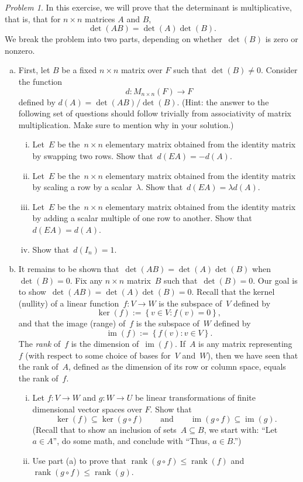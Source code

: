 \documentclass[11pt,twoside]{amsart}
\theoremstyle{plain}
\theoremstyle{remark}
\newtheorem{prob}{Problem}
\theoremstyle{definition}
\theoremstyle{definition}
\newcommand{\im}{\operatorname{im}}
\newcommand{\rank}{\operatorname{rank}}
\begin{document}
\begin{prob}
   In this exercise, we will prove that the determinant is multiplicative, that is, that for $n\times n$ matrices $A$ and $B$, 
  \[
      \det(AB)=\det(A)\det(B).
  \]    
  We break the problem into two parts, depending on whether~$\det(B)$ is zero or
  nonzero.  
  
  \begin{enumerate}[(a)]
  \item First, let $B$ be a fixed $n\times n$ matrix over $F$ such that
  $\det(B)\neq 0$. Consider the function
  \[
    d\colon M_{n\times n}(F) \longrightarrow F
  \] 
  defined by $d(A)=\det(AB)/\det(B)$. (Hint: the answer to the following set of
    questions should follow trivially from associativity of matrix
  multiplication.  Make sure to mention why in your solution.)
  \begin{enumerate}[(i)]
    \item Let~$E$ be the~$n\times n$ elementary matrix obtained from the
      identity matrix by swapping two rows.  Show that~$d(EA)=-d(A)$.
    \item Let~$E$ be the~$n\times n$ elementary matrix obtained from the
      identity matrix by scaling a row by a scalar~$\lambda$.  Show
      that~$d(EA)=\lambda d(A)$.
    \item Let~$E$ be the~$n\times n$ elementary matrix obtained from the
      identity matrix by adding a scalar multiple of one row to another.  Show
      that~$d(EA)= d(A)$.
    \item Show that~$d(I_n)=1$.
  \end{enumerate}
\item It remains to be shown that~$\det(AB)=\det(A)\det(B)$ when~$\det(B)=0$.
  Fix any $n\times n$ matrix~$B$ such that~$\det(B)=0$.  Our goal is to
  show~$\det(AB)=\det(A)\det(B)=0$.
    Recall that the kernel (nullity) of a linear function~$f\colon V\to W$ is the
    subspace of~$V$ defined by
    \[
      \ker(f) := \left\{ v\in V: f(v)=0 \right\},
    \]
    and that the image (range) of~$f$ is the subspace of~$W$ defined by
  \[
    \im(f):=\left\{ f(v):v\in V \right\}.
  \]
The {\em rank} of~$f$ is the dimension of~$\im(f)$.  If~$A$ is any matrix
  representing~$f$ (with respect to some choice of bases for~$V$ and~$W$), then
  we have seen that
    the rank of~$A$, defined as the dimension of its row or column space, equals
     the rank of~$f$.
  
  \begin{enumerate}[(i)]
    \item Let $f\colon V \to W$ and $g\colon W \to U$ be linear transformations of finite dimensional vector spaces over $F$. Show that 
  \[
    \ker(f) \subseteq \ker(g\circ f) \qquad \text{and} \qquad \im(g\circ f)
    \subseteq \im(g).
\]
(Recall that to show an inclusion of sets~$A\subseteq B$, we start with:
  ``Let~$a\in A$'', do some math, and conclude with ``Thus, $a\in B$.'')
  \item Use part (a) to prove that $\rank(g\circ f)\leq \rank(f)$ and $\rank(g\circ f)\leq \rank(g)$. 
  

\end{enumerate}
\end{enumerate}
\end{prob}
\end{document}
